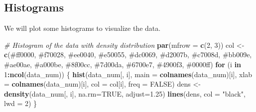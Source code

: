 \documentclass[
]{article}
\newenvironment{Shaded}{\begin{snugshade}}{\end{snugshade}}
\newcommand{\AttributeTok}[1]{\textcolor[rgb]{0.13,0.29,0.53}{#1}}
\newcommand{\CommentTok}[1]{\textcolor[rgb]{0.56,0.35,0.01}{\textit{#1}}}
\newcommand{\ConstantTok}[1]{\textcolor[rgb]{0.56,0.35,0.01}{#1}}
\newcommand{\ControlFlowTok}[1]{\textcolor[rgb]{0.13,0.29,0.53}{\textbf{#1}}}
\newcommand{\DecValTok}[1]{\textcolor[rgb]{0.00,0.00,0.81}{#1}}
\newcommand{\FloatTok}[1]{\textcolor[rgb]{0.00,0.00,0.81}{#1}}
\newcommand{\FunctionTok}[1]{\textcolor[rgb]{0.13,0.29,0.53}{\textbf{#1}}}
\newcommand{\NormalTok}[1]{#1}
\newcommand{\OtherTok}[1]{\textcolor[rgb]{0.56,0.35,0.01}{#1}}
\newcommand{\SpecialCharTok}[1]{\textcolor[rgb]{0.81,0.36,0.00}{\textbf{#1}}}
\newcommand{\StringTok}[1]{\textcolor[rgb]{0.31,0.60,0.02}{#1}}
\begin{document}
\hypertarget{histograms}{%
\subsection{Histograms}\label{histograms}}

We will plot some histograms to visualize the data.

\begin{Shaded}
\begin{Highlighting}[]
\CommentTok{\# Histogram of the data with density distribution}
\FunctionTok{par}\NormalTok{(}\AttributeTok{mfrow =} \FunctionTok{c}\NormalTok{(}\DecValTok{2}\NormalTok{, }\DecValTok{3}\NormalTok{))}
\NormalTok{col }\OtherTok{\textless{}{-}} \FunctionTok{c}\NormalTok{(}\StringTok{\textquotesingle{}\#ff0000\textquotesingle{}}\NormalTok{, }\StringTok{\textquotesingle{}\#f70028\textquotesingle{}}\NormalTok{, }\StringTok{\textquotesingle{}\#ee0040\textquotesingle{}}\NormalTok{, }\StringTok{\textquotesingle{}\#e50055\textquotesingle{}}\NormalTok{, }\StringTok{\textquotesingle{}\#dc0069\textquotesingle{}}\NormalTok{,}
         \StringTok{\textquotesingle{}\#d2007b\textquotesingle{}}\NormalTok{, }\StringTok{\textquotesingle{}\#c7008d\textquotesingle{}}\NormalTok{, }\StringTok{\textquotesingle{}\#bb009e\textquotesingle{}}\NormalTok{, }\StringTok{\textquotesingle{}\#ae00ae\textquotesingle{}}\NormalTok{, }\StringTok{\textquotesingle{}\#a000be\textquotesingle{}}\NormalTok{,}
         \StringTok{\textquotesingle{}\#8f00cc\textquotesingle{}}\NormalTok{, }\StringTok{\textquotesingle{}\#7d00da\textquotesingle{}}\NormalTok{, }\StringTok{\textquotesingle{}\#6700e7\textquotesingle{}}\NormalTok{, }\StringTok{\textquotesingle{}\#4900f3\textquotesingle{}}\NormalTok{, }\StringTok{\textquotesingle{}\#0000ff\textquotesingle{}}\NormalTok{)}
\ControlFlowTok{for}\NormalTok{ (i }\ControlFlowTok{in} \DecValTok{1}\SpecialCharTok{:}\FunctionTok{ncol}\NormalTok{(data\_num)) \{}
  \FunctionTok{hist}\NormalTok{(data\_num[, i], }\AttributeTok{main =} \FunctionTok{colnames}\NormalTok{(data\_num)[i],}
       \AttributeTok{xlab =} \FunctionTok{colnames}\NormalTok{(data\_num)[i], }\AttributeTok{col =}\NormalTok{ col[i], }\AttributeTok{freq =} \ConstantTok{FALSE}\NormalTok{)}
\NormalTok{  dens }\OtherTok{\textless{}{-}} \FunctionTok{density}\NormalTok{(data\_num[, i], }\AttributeTok{na.rm=}\ConstantTok{TRUE}\NormalTok{, }\AttributeTok{adjust=}\FloatTok{1.25}\NormalTok{)}
  \FunctionTok{lines}\NormalTok{(dens, }\AttributeTok{col =} \StringTok{"black"}\NormalTok{, }\AttributeTok{lwd =} \DecValTok{2}\NormalTok{)}
\NormalTok{\}}
\end{Highlighting}
\end{Shaded}
\end{document}
